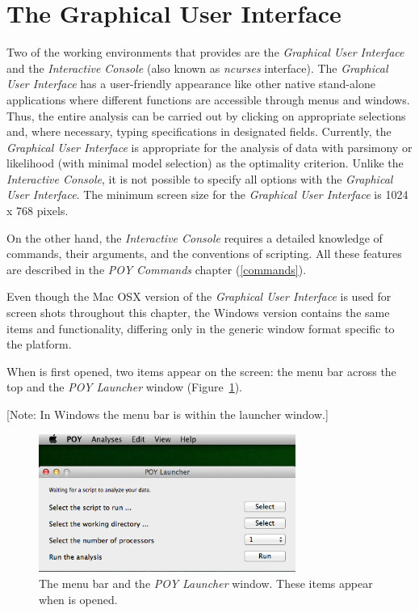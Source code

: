 
\section{The Graphical User Interface}

Two of the working environments that \poy provides are the \emph{Graphical User Interface} and the 
\emph{Interactive Console} (also known as  \emph{ncurses} interface). The \emph{Graphical User 
Interface} has a user-friendly appearance like other native stand-alone applications where different 
functions are accessible through menus and windows. Thus, the entire analysis can be 
carried out by clicking on appropriate selections and, where necessary, typing specifications in 
designated fields. Currently, the \emph{Graphical User Interface} is appropriate for the analysis of 
data with parsimony or likelihood (with minimal model selection) as the optimality criterion.  Unlike the 
\emph{Interactive Console}, it is not possible to specify all options with the \emph{Graphical User Interface}.
The minimum screen size for the \emph{Graphical User Interface} is 1024 x 768 pixels.

On the other hand, the \emph{Interactive Console} requires a detailed knowledge of \poy commands, 
their arguments, and the conventions of \poy scripting. All these features are described in the 
\emph{POY Commands} chapter (\ref{commands}).

Even though the Mac OSX version of the \emph{Graphical User Interface} is used for screen 
shots throughout this chapter, the Windows version contains the same items and 
functionality, differing only in the generic window format specific to the platform.

When \poy is first opened, two items appear on the screen: the \poy menu bar across the top and the 
\emph{POY Launcher} window (Figure~\ref{fig:menu_launcher_window}). 

[Note: In Windows the menu bar is within the launcher window.]

\begin{figure}[htpb]
\begin{center}
\includegraphics[width=0.75\textwidth]{doc/figures/menu_launcher_window.jpg}
\end{center}
\caption{The \poy menu bar and the \emph{POY Launcher} window. These items appear when \poy is opened.}
\label{fig:menu_launcher_window}
\end{figure}

